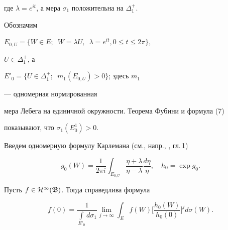 где $\lambda=e^{it}$, а мера $\sigma_1$ положительна на $\Delta^+_1$. 


 


Обозначим 


$E_{0,U}=\{W\in E;\ \;W=\lambda U,\ \;\lambda=e^{it},0\le t\le2\pi\}$, 


$U\in\Delta^+_1$, а 


$E'_0=\{U\in\Delta^+_1;\ \;m_1(E_{0,U})>0\}$; здесь $m_1$ 


--- одномерная нормированная 


мера Лебега на единичной окружности. Теорема Фубини и формула (7) 


показывают, что $\sigma_1(E^1_0)>0$. 


 


Введем одномерную формулу Карлемана (см., напр., \cite{1}, гл.\,1) 


$$ 


g_0(W)=\frac{1}{2\pi i}\int_{E_{0,U}} 


\frac{\eta+\lambda}{\eta-\lambda}\frac{d\eta}{\eta},\quad 


h_0=\exp g_0. 


$$ 


 


\begin{thm} 


Пусть $f\in\cal H^1(\frak B)$. Тогда справедлива формула 


\begin{equation} 


f(0)=\frac{1}{\int\limits_{E'_0}d\sigma_1} 


\lim_{j\to\infty}\int_E f(W)\bigg[ 


\frac{h_0(W)}{h_0(0)}\bigg]^j d\sigma(W). 


\end{equation} 


\end{thm} 


 


